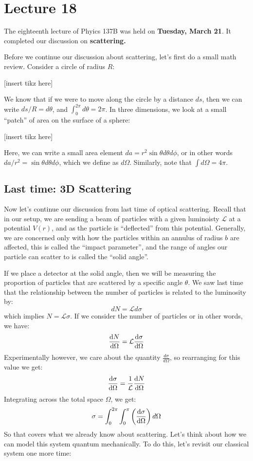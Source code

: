 \chapter{Lecture 18}

The eighteenth lecture of Phyics 137B was held on \textbf{Tuesday, March 21}. It completed our discussion on \textbf{scattering.}

Before we continue our discussion about scattering, let's first do a small math review. Consider a circle of radius $R$:

[insert tikz here]

We know that if we were to move along the circle by a distance $ds$, then we can write $ds/R = d\theta$, and $\int_0^{2\pi} d\theta = 2\pi$. In three dimensions, we look at a small ``patch'' of area on the surface of a sphere: 

[insert tikz here]

Here, we can write a small area element $da = r^2 \sin \theta d\theta d\phi$, or in other words $da/r^2 = \sin \theta d\theta d\phi$, which we define as $d\Omega$. Similarly, note that $\int d\Omega = 4\pi$. 

\section{Last time: 3D Scattering} 

Now let's continue our discussion from last time of optical scattering. Recall that in our setup, we are sending a beam of particles with a given luminoisty $\mathcal L$ at a potential $V(r)$, and as the particle is ``deflected'' from this potential. Generally, we are concerned only with how the particles within an annulus of radius $b$ are affected, this is called the ``impact parameter'', and the range of angles our particle can scatter to is called the ``solid angle''. 

If we place a detector at the solid angle, then we will be measuring the proportion of particles that are scattered by a specific angle $\theta$. We saw last time that the relationship between the number of particles is related to the luminosity by: 
\[ dN = \mathcal L d\sigma\]
which implies $N = \mathcal L \sigma$. If we consider the number of particles or in other words, we have: 
\[ \dv{N}{\Omega} = \mathcal L \dv{\sigma}{\Omega}\]
Experimentally however, we care about the quantity $\frac{d\sigma}{d\Omega}$, so rearranging for this value we get: 
\[ \dv{\sigma}{\Omega} = \frac{1}{\mathcal L} \dv{N}{\Omega}\]
Integrating across the total space $\Omega$, we get:
\[
	\sigma = \int_0^{2\pi} \int_0^\pi \left( \dv{\sigma}{\Omega} \right) d\Omega
\] 
So that covers what we already know about scattering. Let's think about how we can model this system quantum 
mechanically. To do this, let's revisit our classical system one more time: 

